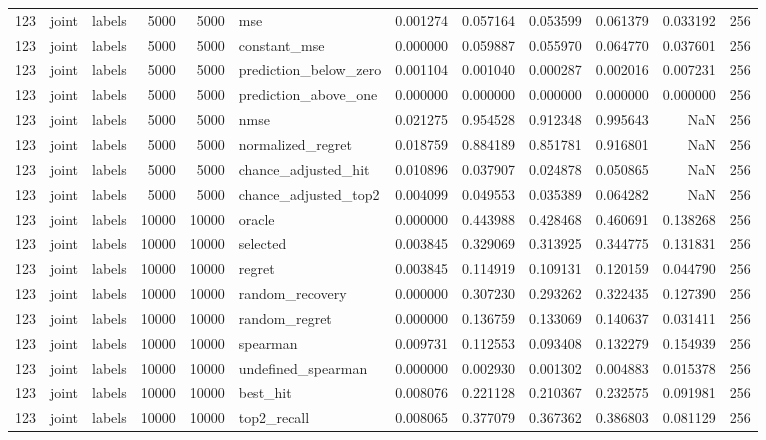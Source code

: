 \begin{tabular}{rllrrlrrrrrr}
123 & joint & labels & 5000 & 5000 & mse & 0.001274 & 0.057164 & 0.053599 & 0.061379 & 0.033192 & 256 \\
123 & joint & labels & 5000 & 5000 & constant_mse & 0.000000 & 0.059887 & 0.055970 & 0.064770 & 0.037601 & 256 \\
123 & joint & labels & 5000 & 5000 & prediction_below_zero & 0.001104 & 0.001040 & 0.000287 & 0.002016 & 0.007231 & 256 \\
123 & joint & labels & 5000 & 5000 & prediction_above_one & 0.000000 & 0.000000 & 0.000000 & 0.000000 & 0.000000 & 256 \\
123 & joint & labels & 5000 & 5000 & nmse & 0.021275 & 0.954528 & 0.912348 & 0.995643 & NaN & 256 \\
123 & joint & labels & 5000 & 5000 & normalized_regret & 0.018759 & 0.884189 & 0.851781 & 0.916801 & NaN & 256 \\
123 & joint & labels & 5000 & 5000 & chance_adjusted_hit & 0.010896 & 0.037907 & 0.024878 & 0.050865 & NaN & 256 \\
123 & joint & labels & 5000 & 5000 & chance_adjusted_top2 & 0.004099 & 0.049553 & 0.035389 & 0.064282 & NaN & 256 \\
123 & joint & labels & 10000 & 10000 & oracle & 0.000000 & 0.443988 & 0.428468 & 0.460691 & 0.138268 & 256 \\
123 & joint & labels & 10000 & 10000 & selected & 0.003845 & 0.329069 & 0.313925 & 0.344775 & 0.131831 & 256 \\
123 & joint & labels & 10000 & 10000 & regret & 0.003845 & 0.114919 & 0.109131 & 0.120159 & 0.044790 & 256 \\
123 & joint & labels & 10000 & 10000 & random_recovery & 0.000000 & 0.307230 & 0.293262 & 0.322435 & 0.127390 & 256 \\
123 & joint & labels & 10000 & 10000 & random_regret & 0.000000 & 0.136759 & 0.133069 & 0.140637 & 0.031411 & 256 \\
123 & joint & labels & 10000 & 10000 & spearman & 0.009731 & 0.112553 & 0.093408 & 0.132279 & 0.154939 & 256 \\
123 & joint & labels & 10000 & 10000 & undefined_spearman & 0.000000 & 0.002930 & 0.001302 & 0.004883 & 0.015378 & 256 \\
123 & joint & labels & 10000 & 10000 & best_hit & 0.008076 & 0.221128 & 0.210367 & 0.232575 & 0.091981 & 256 \\
123 & joint & labels & 10000 & 10000 & top2_recall & 0.008065 & 0.377079 & 0.367362 & 0.386803 & 0.081129 & 256 \\

\end{tabular}
